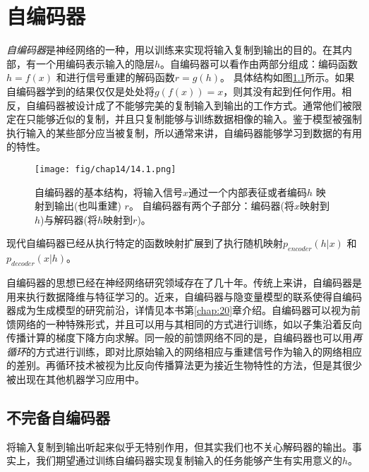 
\chapter{自编码器}
\label{chap:14}

\emph{自编码器}是神经网络的一种，用以训练来实现将输入复制到输出的目的。在其内部，有一个用编码表示输入的隐层$h$。自编码器可以看作由两部分组成：编码函数$h = f(x)$ 和进行信号重建的解码函数$r = g(h)$。 具体结构如图\ref{fig:14.1}所示。如果自编码器学到的结果仅仅是处处将$g(f(x)) = x$，则其没有起到任何作用。相反，自编码器被设计成了不能够完美的复制输入到输出的工作方式。通常他们被限定在只能够近似的复制，并且只复制能够与训练数据相像的输入。鉴于模型被强制执行输入的某些部分应当被复制，所以通常来讲，自编码器能够学习到数据的有用的特性。


\begin{figure}[htbp] %
   \centering
   \texttt{[image: fig/chap14/14.1.png]} 
   \caption{自编码器的基本结构，将输入信号$x$通过一个内部表征或者编码$h$ 映射到输出(也叫重建) $r$。 自编码器有两个子部分：编码器(将$x$映射到$h$)与解码器(将$h$映射到$r$)。}
   \label{fig:14.1}
\end{figure}

现代自编码器已经从执行特定的函数映射扩展到了执行随机映射$p_{encoder}(h|x)$ 和 $p_{decoder}(x|h)$。

自编码器的思想已经在神经网络研究领域存在了几十年。传统上来讲，自编码器是用来执行数据降维与特征学习的。近来，自编码器与隐变量模型的联系使得自编码器成为生成模型的研究前沿，详情见本书第\ref{chap:20}章介绍。自编码器可以视为前馈网络的一种特殊形式，并且可以用与其相同的方式进行训练，如以子集沿着反向传播计算的梯度下降方向求解。同一般的前馈网络不同的是，自编码器也可以用\emph{再循环}的方式进行训练，即对比原始输入的网络相应与重建信号作为输入的网络相应的差别。再循环技术被视为比反向传播算法更为接近生物特性的方法，但是其很少被出现在其他机器学习应用中。

\section{不完备自编码器}
将输入复制到输出听起来似乎无特别作用，但其实我们也不关心解码器的输出。事实上，我们期望通过训练自编码器实现复制输入的任务能够产生有实用意义的$h$。

